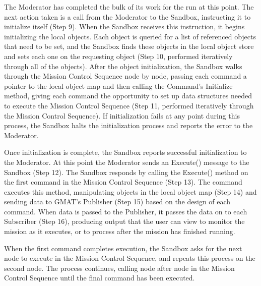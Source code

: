 \label{section:SandboxInitializationOverview}The Moderator has completed the bulk of its work for
the run at this point.  The next action taken is a call from the Moderator to the Sandbox,
instructing it to initialize itself (Step 9).  When the Sandbox receives this instruction, it begins
initializing the local objects.  Each object is queried for a list of referenced objects that need
to be set, and the Sandbox finds these objects in the local object store and sets each one on the
requesting object (Step 10, performed iteratively through all of the objects).  After the object
initialization, the Sandbox walks through the Mission Control Sequence node by node, passing each
command a pointer to the local object map and then calling the Command's Initialize method, giving
each command the opportunity to set up data structures needed to execute the Mission Control
Sequence  (Step 11, performed iteratively through the Mission Control Sequence).  If initialization
fails at any point during this process, the Sandbox halts the initialization process and reports the
error to the Moderator.

Once initialization is complete, the Sandbox reports successful initialization to the Moderator.  At
this point the Moderator sends an Execute() message to the Sandbox (Step 12).  The Sandbox responds
by calling the Execute() method on the first command in the Mission Control Sequence (Step 13).  The
command executes this method, manipulating objects in the local object map  (Step 14) and sending
data to GMAT's Publisher (Step 15) based on the design of each command.  When data is passed to the
Publisher, it passes the data on to each Subscriber (Step 16), producing output that the user can
view to monitor the mission as it executes, or to process after the mission has finished running.

When the first command completes execution, the Sandbox asks for the next node to execute in the
Mission Control Sequence, and repeats this process on the second node.  The process continues,
calling node after node in the Mission Control Sequence until the final command has been executed.

